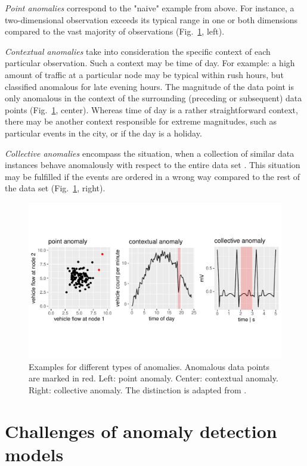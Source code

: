 \documentclass[conference]{IEEEtran}
\begin{document}
\emph{Point anomalies} correspond to the "naive" example from above. For instance, a two-dimensional observation exceeds its typical range in one or both dimensions compared to the vast majority of observations (Fig.~\ref{fig:types}, left).

\emph{Contextual anomalies} take into consideration the specific context of each particular observation. Such a context may be time of day. For example: a high amount of traffic at a particular node may be typical within rush hours, but classified anomalous for late evening hours. The magnitude of the data point is only anomalous in the context of the surrounding (preceding or subsequent) data points (Fig.~\ref{fig:types}, center). Whereas time of day is a rather straightforward context, there may be another context responsible for extreme magnitudes, such as particular events in the city, or if the day is a holiday.

\emph{Collective anomalies} encompass the situation, when a collection of similar data instances behave anomalously with respect to the entire data set \cite{ahmed2016survey}. This situation may be fulfilled if the events are ordered in a wrong way compared to the rest of the data set (Fig.~\ref{fig:types}, right).

\begin{figure}[!ht]
\centering
\includegraphics[width=0.9\linewidth, trim=0 75 0 75, clip]{images/types.pdf}%
\caption{Examples for different types of anomalies. Anomalous data points are marked in red. Left: point anomaly. Center: contextual anomaly. Right: collective anomaly. The distinction is adapted from \cite{chandola2009anomaly}.}
\label{fig:types}
\end{figure}


\section{Challenges of anomaly detection models} \label{sec:challenges}
\end{document}
